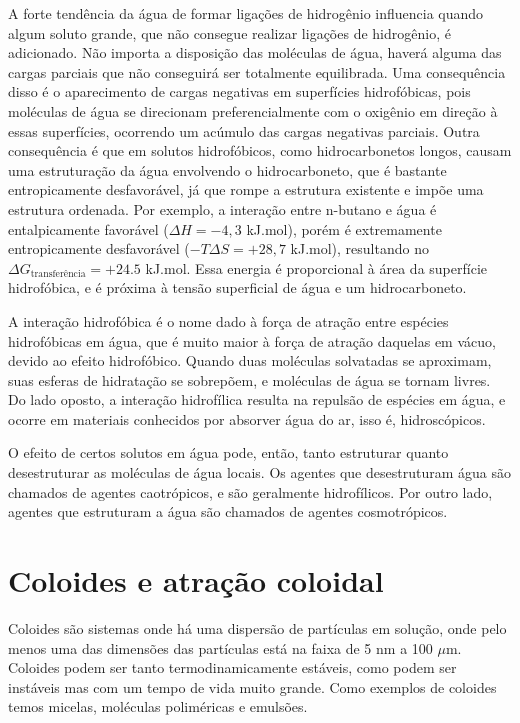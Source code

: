 	A forte tendência da água de formar ligações de hidrogênio influencia quando algum soluto grande, que não consegue realizar ligações de hidrogênio, é adicionado. Não importa a disposição das moléculas de água, haverá alguma das cargas parciais que não conseguirá ser totalmente equilibrada. Uma consequência disso é o aparecimento de cargas negativas em superfícies hidrofóbicas, pois moléculas de água se direcionam preferencialmente com o oxigênio em direção à essas superfícies, ocorrendo um acúmulo das cargas negativas parciais. Outra consequência é que em solutos hidrofóbicos, como hidrocarbonetos longos, causam uma estruturação da água envolvendo o hidrocarboneto, que é bastante entropicamente desfavorável, já que rompe a estrutura existente e impõe uma estrutura ordenada. Por exemplo, a interação entre n-butano e água é entalpicamente favorável (\(\Delta H = -4,3\) kJ.mol\menosUm), porém é extremamente entropicamente desfavorável (\(-T\Delta S = +28,7\) kJ.mol\menosUm), resultando no \(\Delta G_{\mathrm{transferência}} = +24.5\) kJ.mol\menosUm. Essa energia é proporcional à área da superfície hidrofóbica, e é próxima à tensão superficial de água e um hidrocarboneto.
	
	A interação hidrofóbica é o nome dado à força de atração entre espécies hidrofóbicas em água, que é muito maior à força de atração daquelas em vácuo, devido ao efeito hidrofóbico. Quando duas moléculas solvatadas se aproximam, suas esferas de hidratação se sobrepõem, e moléculas de água se tornam livres. Do lado oposto, a interação hidrofílica resulta na repulsão de espécies em água, e ocorre em materiais conhecidos por absorver água do ar, isso é, hidroscópicos.
	
	O efeito de certos solutos em água pode, então, tanto estruturar quanto desestruturar as moléculas de água locais. Os agentes que desestruturam água são chamados de agentes caotrópicos, e são geralmente hidrofílicos. Por outro lado, agentes que estruturam a água são chamados de agentes cosmotrópicos. %
	
	
	\section{Coloides e atração coloidal}
	\label{sec:coloides_atracao_coloidal}
	Coloides são sistemas onde há uma dispersão de partículas em solução, onde pelo menos uma das dimensões das partículas está na faixa de 5 nm a 100 \(\mu\)m. Coloides podem ser tanto termodinamicamente estáveis, como podem ser instáveis mas com um tempo de vida muito grande. Como exemplos de coloides temos micelas, moléculas poliméricas e emulsões. %
	
